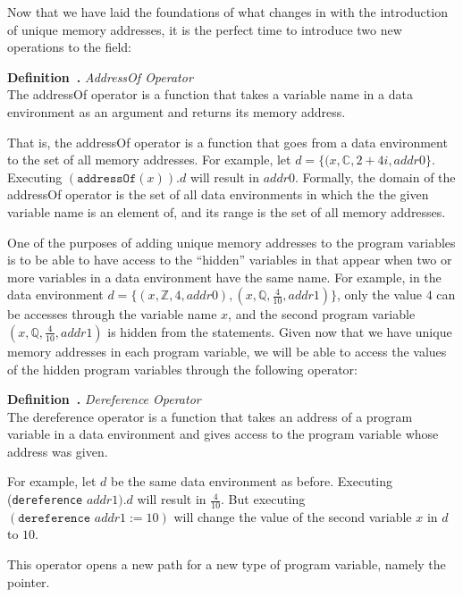 \documentclass[11pt]{article}
\newcounter{definition}
\newenvironment{definition}[1][]{\stepcounter{definition}\par\medskip\noindent
\textbf{Definition~\thesection.\thedefinition #1} \rmfamily}{}
\newcounter{example}
\newcounter{result}
\begin{document}
Now that we have laid the foundations of what changes in \cite{baber} with the introduction of unique memory addresses, it is the perfect time to introduce two new operations to the field:

\begin{definition} \emph{AddressOf Operator} \\
The addressOf operator is a function that takes a variable name in a data environment as an argument and returns its memory address.
\medskip
\end{definition}

That is, the addressOf operator is a function that goes from a data environment to the set of all memory addresses. For example, let $d=\{(x,\mathbb{C},2+4i,addr0\}$. Executing $(\texttt{addressOf}(x)).d$ will result in $addr0$. Formally, the domain of the addressOf operator is the set of all data environments in which the the given variable name is an element of, and its range is the set of all memory addresses.

One of the purposes of adding unique memory addresses to the program variables is to be able to have access to the ``hidden'' variables in \cite{baber} that appear when two or more variables in a data environment have the same name. For example, in the data environment $d=\{(x,\mathbb{Z},4,addr0),(x,\mathbb{Q},\frac{4}{10},addr1)\}$, only the value $4$ can be accesses through the variable name $x$, and the second program variable $(x,\mathbb{Q},\frac{4}{10},addr1)$ is hidden from the statements. Given now that we have unique memory addresses in each program variable, we will be able to access the values of the hidden program variables through the following operator:

\begin{definition} \emph{Dereference Operator} \\
The dereference operator is a function that takes an address of a program variable in a data environment and gives access to the program variable whose address was given. \medskip
\end{definition}

For example, let $d$ be the same data environment as before. Executing (\texttt{dereference} $addr1).d$ will result in $\frac{4}{10}$. But executing $(\texttt{dereference } addr1 := 10)$ will change the value of the second variable $x$ in $d$ to $10$.

This operator opens a new path for a new type of program variable, namely the pointer.
\end{document}

